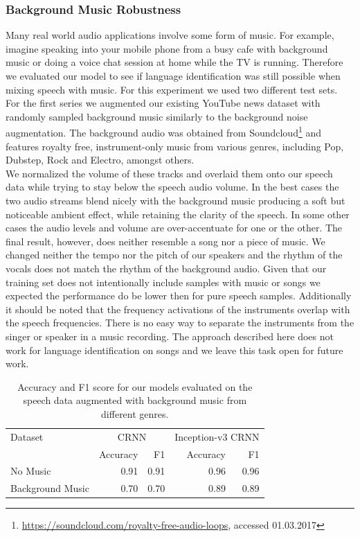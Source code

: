 \subsubsection{Background Music Robustness} 
\label{sec:music_robustness}
Many real world audio applications involve some form of music. For example, imagine speaking into your mobile phone from a busy cafe with background music or doing a voice chat session at home while the TV is running. Therefore we evaluated our model to see if language identification was still possible when mixing speech with music. For this experiment we used two different test sets. For the first series we augmented our existing YouTube news dataset with randomly sampled background music similarly to the background noise augmentation. The background audio was obtained from Soundcloud\footnote{\url{https://soundcloud.com/royalty-free-audio-loops}, accessed 01.03.2017} and features royalty free, instrument-only music from various genres, including Pop, Dubstep, Rock and Electro, amongst others.\\ 
We normalized the volume of these tracks and overlaid them onto our speech data while trying to stay below the speech audio volume. In the best cases the two audio streams blend nicely with the background music producing a soft but noticeable ambient effect, while retaining the clarity of the speech. In some other cases the audio levels and volume are over-accentuate for one or the other. The final result, however, does neither resemble a song nor a piece of music. We changed neither the tempo nor the pitch of our speakers and the rhythm of the vocals does not match the rhythm of the background audio. Given that our training set does not intentionally include samples with music or songs we expected the performance do be lower then for pure speech samples. Additionally it should be noted that the frequency activations of the instruments overlap with the speech frequencies. There is no easy way to separate the instruments from the singer or speaker in a music recording. The approach described here does not work for language identification on songs and we leave this task open for future work. 
	\begin{table}[]
	\centering
	\begin{tabularx}{\textwidth}{lrrrr}
	\toprule
Dataset & \multicolumn{2}{c}{CRNN} & \multicolumn{2}{c}{Inception-v3 CRNN} \\   
                  & Accuracy  & F1    & Accuracy   & F1   \\ \midrule
No Music		  & 0.91		  & 0.91	  & 0.96	  & 0.96 \\                     
Background Music  & 0.70      & 0.70  & 0.89  & 0.89 \\
 	\bottomrule
	\end{tabularx}
	\caption{Accuracy and F1 score for our models evaluated on the speech data augmented with background music from different genres.}
	\label{tab:audio_duration}
	\end{table}


